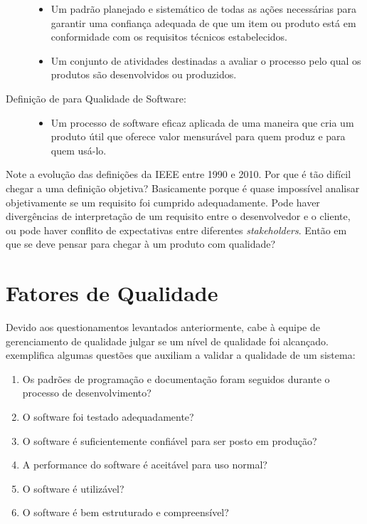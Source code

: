 \documentclass[
	12pt,				%
	openright,			%
	twoside,			%
	a4paper,			%
	english,			%
	brazil,				%
	]{abntex2}
\begin{document}
\begin{description}
        \begin{itemize}
            \item Um padrão planejado e sistemático de todas as ações necessárias para garantir uma confiança adequada de que um item ou produto está em conformidade com os requisitos técnicos estabelecidos.
            \item Um conjunto de atividades destinadas a avaliar o processo pelo qual os produtos são desenvolvidos ou produzidos.
        \end{itemize}
    \item[Definição de \citeonline{PRESSMAN2010} para Qualidade de Software:] \hfill
        \begin{itemize}
            \item Um processo de software eficaz aplicada de uma maneira que cria um produto útil que oferece valor mensurável para quem produz e para quem usá-lo.
        \end{itemize}
\end{description}

Note a evolução das definições da IEEE entre 1990 e 2010. Por que é tão difícil chegar a uma definição objetiva? Basicamente porque é quase impossível analisar objetivamente se um requisito foi cumprido adequadamente. Pode haver divergências de interpretação de um requisito entre o desenvolvedor e o cliente, ou pode haver conflito de expectativas entre diferentes \emph{stakeholders}. Então em que se deve pensar para chegar à um produto com qualidade?

\section{Fatores de Qualidade}

Devido aos questionamentos levantados anteriormente, cabe à equipe de gerenciamento de qualidade julgar se um nível de qualidade foi alcançado.  exemplifica algumas questões que auxiliam a validar a qualidade de um sistema:
\begin{enumerate}
    \item Os padrões de programação e documentação foram seguidos durante o processo de desenvolvimento?
    \item O software foi testado adequadamente?
    \item O software é suficientemente confiável para ser posto em produção?
    \item A performance do software é aceitável para uso normal?
    \item O software é utilizável?
    \item O software é bem estruturado e compreensível?
\end{enumerate}
\end{document}
